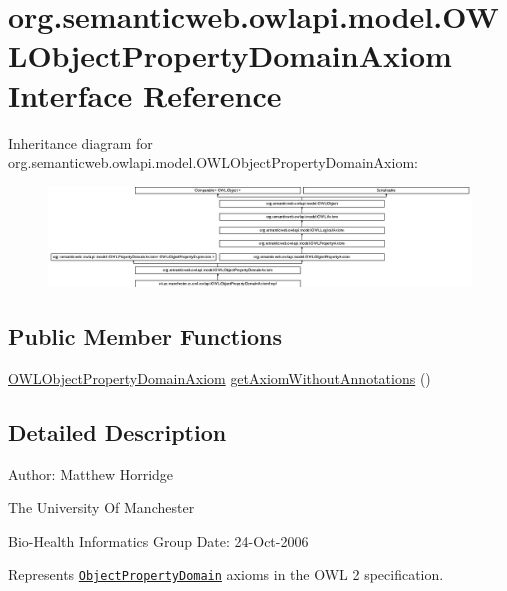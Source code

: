 \hypertarget{interfaceorg_1_1semanticweb_1_1owlapi_1_1model_1_1_o_w_l_object_property_domain_axiom}{\section{org.\-semanticweb.\-owlapi.\-model.\-O\-W\-L\-Object\-Property\-Domain\-Axiom Interface Reference}
\label{interfaceorg_1_1semanticweb_1_1owlapi_1_1model_1_1_o_w_l_object_property_domain_axiom}
}
Inheritance diagram for org.\-semanticweb.\-owlapi.\-model.\-O\-W\-L\-Object\-Property\-Domain\-Axiom\-:\begin{figure}[H]
\begin{center}
\leavevmode
\includegraphics[height=2.681029cm]{interfaceorg_1_1semanticweb_1_1owlapi_1_1model_1_1_o_w_l_object_property_domain_axiom}
\end{center}
\end{figure}
\subsection*{Public Member Functions}
\begin{DoxyCompactItemize}
\item 
\hyperlink{interfaceorg_1_1semanticweb_1_1owlapi_1_1model_1_1_o_w_l_object_property_domain_axiom}{O\-W\-L\-Object\-Property\-Domain\-Axiom} \hyperlink{interfaceorg_1_1semanticweb_1_1owlapi_1_1model_1_1_o_w_l_object_property_domain_axiom_a99f79302e3db742f1b767024fee9c1a5}{get\-Axiom\-Without\-Annotations} ()
\end{DoxyCompactItemize}


\subsection{Detailed Description}
Author\-: Matthew Horridge\par
 The University Of Manchester\par
 Bio-\/\-Health Informatics Group Date\-: 24-\/\-Oct-\/2006 

Represents \href{http://www.w3.org/TR/2009/REC-owl2-syntax-20091027/#Object_Property_Domain}{\tt Object\-Property\-Domain} axioms in the O\-W\-L 2 specification. 


